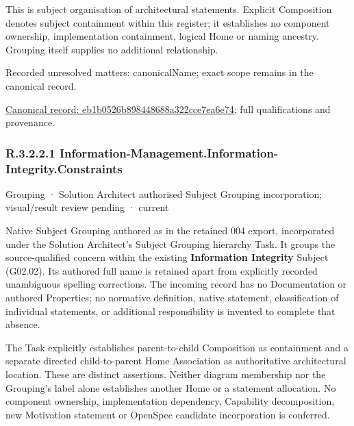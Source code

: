 This is subject organisation of architectural statements. Explicit Composition denotes subject containment within this register; it establishes no component ownership, implementation containment, logical Home or naming ancestry. Grouping itself supplies no additional relationship.


{\small Recorded unresolved matters: canonicalName; exact scope remains in the canonical record.}\par
{\footnotesize \href{../../../../continuum/grouping/eb1b0526b898448688a322cce7ea6e74.md}{Canonical record: eb1b0526b898448688a322cce7ea6e74}; full qualifications and provenance.}\par
\subsubsection*{R.3.2.2.1 Information-Management.Information-Integrity.Constraints}
\label{navigation:R.3.2.2.1}

\label{element:80aa94b4210047a0a14563f408da1694}
{\small Grouping · Solution Architect authorised Subject Grouping incorporation; visual/result review pending · current}\par

Native Subject Grouping authored as \texttt{} in the retained 004 export,
incorporated under the Solution Architect's Subject Grouping hierarchy Task.
It groups the source-qualified \texttt{} concern within
the existing \textbf{Information Integrity} Subject (G02.02). Its authored full name
is retained apart from explicitly recorded unambiguous spelling corrections.
The incoming record has no Documentation or authored Properties; no normative
definition, native statement, classification of individual statements, or
additional responsibility is invented to complete that absence.



The Task explicitly establishes parent-to-child Composition as containment and
a separate directed child-to-parent Home Association as authoritative architectural
location. These are distinct assertions. Neither diagram membership nor the
Grouping's label alone establishes another Home or a statement allocation.
No component ownership, implementation dependency, Capability decomposition,
new Motivation statement or OpenSpec candidate incorporation is conferred.



